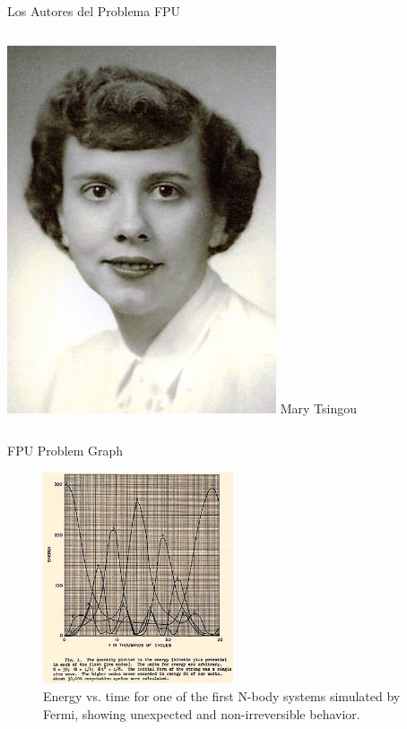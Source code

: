 \begin{frame}{Los Autores del Problema FPU}
\begin{columns}[T]
        \begin{column}{0.24\textwidth}
            \centering
            \includegraphics[width=\textwidth]{images/tsingou.jpg}
            Mary Tsingou
        \end{column}
    \end{columns}
\end{frame}


\begin{frame}{FPU Problem Graph}
    \begin{figure}
        \includegraphics[width=0.5\textwidth]{images/MANIAC.png}
        \caption{Energy vs. time for one of the first N-body systems simulated by Fermi, showing unexpected and non-irreversible behavior.}
    \end{figure}
\end{frame}

